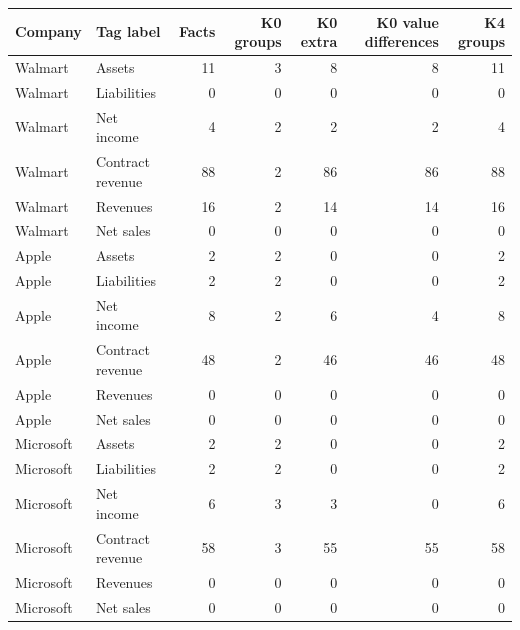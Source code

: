 \documentclass[11pt,letterpaper]{article}
\newcommand{\heading}[1]{\vspace{4pt}{\large\bfseries #1}\par}
\newcommand{\BoundAV}{11}
\newcommand{\BoundAW}{3}
\newcommand{\BoundAX}{8}
\newcommand{\BoundAY}{8}
\newcommand{\BoundAZ}{11}
\newcommand{\BoundBA}{0}
\newcommand{\BoundBB}{0}
\newcommand{\BoundBC}{0}
\newcommand{\BoundBD}{0}
\newcommand{\BoundBE}{0}
\newcommand{\BoundBF}{4}
\newcommand{\BoundBG}{2}
\newcommand{\BoundBH}{2}
\newcommand{\BoundBI}{2}
\newcommand{\BoundBJ}{4}
\newcommand{\BoundBK}{88}
\newcommand{\BoundBL}{2}
\newcommand{\BoundBM}{86}
\newcommand{\BoundBN}{86}
\newcommand{\BoundBO}{88}
\newcommand{\BoundBP}{16}
\newcommand{\BoundBQ}{2}
\newcommand{\BoundBR}{14}
\newcommand{\BoundBS}{14}
\newcommand{\BoundBT}{16}
\newcommand{\BoundBU}{0}
\newcommand{\BoundBV}{0}
\newcommand{\BoundBW}{0}
\newcommand{\BoundBX}{0}
\newcommand{\BoundBY}{0}
\newcommand{\BoundBZ}{2}
\newcommand{\BoundCA}{2}
\newcommand{\BoundCB}{0}
\newcommand{\BoundCC}{0}
\newcommand{\BoundCD}{2}
\newcommand{\BoundCE}{2}
\newcommand{\BoundCF}{2}
\newcommand{\BoundCG}{0}
\newcommand{\BoundCH}{0}
\newcommand{\BoundCI}{2}
\newcommand{\BoundCJ}{8}
\newcommand{\BoundCK}{2}
\newcommand{\BoundCL}{6}
\newcommand{\BoundCM}{4}
\newcommand{\BoundCN}{8}
\newcommand{\BoundCO}{48}
\newcommand{\BoundCP}{2}
\newcommand{\BoundCQ}{46}
\newcommand{\BoundCR}{46}
\newcommand{\BoundCS}{48}
\newcommand{\BoundCT}{0}
\newcommand{\BoundCU}{0}
\newcommand{\BoundCV}{0}
\newcommand{\BoundCW}{0}
\newcommand{\BoundCX}{0}
\newcommand{\BoundCY}{0}
\newcommand{\BoundCZ}{0}
\newcommand{\BoundDA}{0}
\newcommand{\BoundDB}{0}
\newcommand{\BoundDC}{0}
\newcommand{\BoundDD}{2}
\newcommand{\BoundDE}{2}
\newcommand{\BoundDF}{0}
\newcommand{\BoundDG}{0}
\newcommand{\BoundDH}{2}
\newcommand{\BoundDI}{2}
\newcommand{\BoundDJ}{2}
\newcommand{\BoundDK}{0}
\newcommand{\BoundDL}{0}
\newcommand{\BoundDM}{2}
\newcommand{\BoundDN}{6}
\newcommand{\BoundDO}{3}
\newcommand{\BoundDP}{3}
\newcommand{\BoundDQ}{0}
\newcommand{\BoundDR}{6}
\newcommand{\BoundDS}{58}
\newcommand{\BoundDT}{3}
\newcommand{\BoundDU}{55}
\newcommand{\BoundDV}{55}
\newcommand{\BoundDW}{58}
\newcommand{\BoundDX}{0}
\newcommand{\BoundDY}{0}
\newcommand{\BoundDZ}{0}
\newcommand{\BoundEA}{0}
\newcommand{\BoundEB}{0}
\newcommand{\BoundEC}{0}
\newcommand{\BoundED}{0}
\newcommand{\BoundEE}{0}
\newcommand{\BoundEF}{0}
\newcommand{\BoundEG}{0}
\begin{document}
\heading{All company/tag cells, including zero coverage}
{\small\setlength{\tabcolsep}{5pt}
\begin{tabular}{@{}llrrrrr@{}}\toprule
Company & Tag label & Facts & K0 groups & K0 extra & K0 value differences & K4 groups\\\midrule
Walmart & Assets & \BoundAV{} & \BoundAW{} & \BoundAX{} & \BoundAY{} & \BoundAZ{} \\
Walmart & Liabilities & \BoundBA{} & \BoundBB{} & \BoundBC{} & \BoundBD{} & \BoundBE{} \\
Walmart & Net income & \BoundBF{} & \BoundBG{} & \BoundBH{} & \BoundBI{} & \BoundBJ{} \\
Walmart & Contract revenue & \BoundBK{} & \BoundBL{} & \BoundBM{} & \BoundBN{} & \BoundBO{} \\
Walmart & Revenues & \BoundBP{} & \BoundBQ{} & \BoundBR{} & \BoundBS{} & \BoundBT{} \\
Walmart & Net sales & \BoundBU{} & \BoundBV{} & \BoundBW{} & \BoundBX{} & \BoundBY{} \\
Apple & Assets & \BoundBZ{} & \BoundCA{} & \BoundCB{} & \BoundCC{} & \BoundCD{} \\
Apple & Liabilities & \BoundCE{} & \BoundCF{} & \BoundCG{} & \BoundCH{} & \BoundCI{} \\
Apple & Net income & \BoundCJ{} & \BoundCK{} & \BoundCL{} & \BoundCM{} & \BoundCN{} \\
Apple & Contract revenue & \BoundCO{} & \BoundCP{} & \BoundCQ{} & \BoundCR{} & \BoundCS{} \\
Apple & Revenues & \BoundCT{} & \BoundCU{} & \BoundCV{} & \BoundCW{} & \BoundCX{} \\
Apple & Net sales & \BoundCY{} & \BoundCZ{} & \BoundDA{} & \BoundDB{} & \BoundDC{} \\
Microsoft & Assets & \BoundDD{} & \BoundDE{} & \BoundDF{} & \BoundDG{} & \BoundDH{} \\
Microsoft & Liabilities & \BoundDI{} & \BoundDJ{} & \BoundDK{} & \BoundDL{} & \BoundDM{} \\
Microsoft & Net income & \BoundDN{} & \BoundDO{} & \BoundDP{} & \BoundDQ{} & \BoundDR{} \\
Microsoft & Contract revenue & \BoundDS{} & \BoundDT{} & \BoundDU{} & \BoundDV{} & \BoundDW{} \\
Microsoft & Revenues & \BoundDX{} & \BoundDY{} & \BoundDZ{} & \BoundEA{} & \BoundEB{} \\
Microsoft & Net sales & \BoundEC{} & \BoundED{} & \BoundEE{} & \BoundEF{} & \BoundEG{} \\
\bottomrule\end{tabular}}
\end{document}
